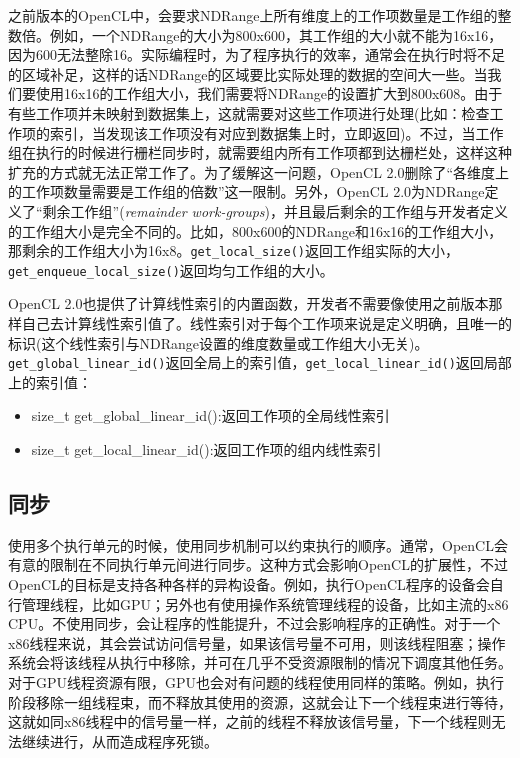 之前版本的OpenCL中，会要求NDRange上所有维度上的工作项数量是工作组的整数倍。例如，一个NDRange的大小为800x600，其工作组的大小就不能为16x16，因为600无法整除16。实际编程时，为了程序执行的效率，通常会在执行时将不足的区域补足，这样的话NDRange的区域要比实际处理的数据的空间大一些。当我们要使用16x16的工作组大小，我们需要将NDRange的设置扩大到800x608。由于有些工作项并未映射到数据集上，这就需要对这些工作项进行处理(比如：检查工作项的索引，当发现该工作项没有对应到数据集上时，立即返回)。不过，当工作组在执行的时候进行栅栏同步时，就需要组内所有工作项都到达栅栏处，这样这种扩充的方式就无法正常工作了。为了缓解这一问题，OpenCL 2.0删除了“各维度上的工作项数量需要是工作组的倍数”这一限制。另外，OpenCL 2.0为NDRange定义了“剩余工作组”(\emph{remainder work-groups})，并且最后剩余的工作组与开发者定义的工作组大小是完全不同的。比如，800x600的NDRange和16x16的工作组大小，那剩余的工作组大小为16x8。\texttt{get\_local\_size()}返回工作组实际的大小，\texttt{get\_enqueue\_local\_size()}返回均匀工作组的大小。

OpenCL 2.0也提供了计算线性索引的内置函数，开发者不需要像使用之前版本那样自己去计算线性索引值了。线性索引对于每个工作项来说是定义明确，且唯一的标识(这个线性索引与NDRange设置的维度数量或工作组大小无关)。\texttt{get\_global\_linear\_id()}返回全局上的索引值，\texttt{get\_local\_linear\_id()}返回局部上的索引值：

\begin{itemize}
\item size\_\allowbreak{}t get\_\allowbreak{}global\_\allowbreak{}linear\_\allowbreak{}id():返回工作项的全局线性索引
\item size\_\allowbreak{}t get\_\allowbreak{}local\_\allowbreak{}linear\_\allowbreak{}id():返回工作项的组内线性索引
\end{itemize}

\subsection{同步}

使用多个执行单元的时候，使用同步机制可以约束执行的顺序。通常，OpenCL会有意的限制在不同执行单元间进行同步。这种方式会影响OpenCL的扩展性，不过OpenCL的目标是支持各种各样的异构设备。例如，执行OpenCL程序的设备会自行管理线程，比如GPU；另外也有使用操作系统管理线程的设备，比如主流的x86 CPU。不使用同步，会让程序的性能提升，不过会影响程序的正确性。对于一个x86线程来说，其会尝试访问信号量，如果该信号量不可用，则该线程阻塞；操作系统会将该线程从执行中移除，并可在几乎不受资源限制的情况下调度其他任务。对于GPU线程资源有限，GPU也会对有问题的线程使用同样的策略。例如，执行阶段移除一组线程束，而不释放其使用的资源，这就会让下一个线程束进行等待，这就如同x86线程中的信号量一样，之前的线程不释放该信号量，下一个线程则无法继续进行，从而造成程序死锁。

